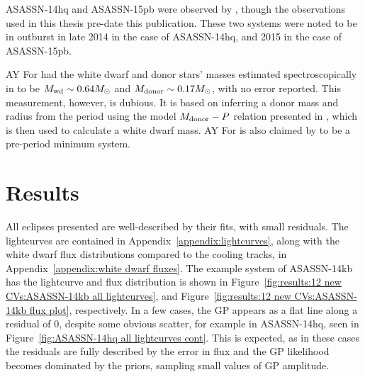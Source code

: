 ASASSN-14hq and ASASSN-15pb were observed by \citet{paterson2019}, though the observations used in this thesis pre-date this publication. These two systems were noted to be in outburst in late 2014 in the case of ASASSN-14hq, and 2015 in the case of ASASSN-15pb.

AY For had the white dwarf and donor stars' masses estimated spectroscopically in \citet{mason2005} to be $M_{\rm wd} \sim 0.64 M_\odot$ and $M_{\rm donor} \sim 0.17 M_\odot$, with no error reported. This measurement, however, is dubious. It is based on inferring a donor mass and radius from the period using the model $M_{\rm donor} - P$ relation presented in \citet{howell2002}, which is then used to calculate a white dwarf mass. AY For is also claimed by \citet{mason2005} to be a pre-period minimum system.


\section{Results}
\label{sect:results:12 new CVs:results}

All eclipses presented are well-described by their fits, with small residuals. The lightcurves are contained in Appendix~\ref{appendix:lightcurves}, along with the white dwarf flux distributions compared to the cooling tracks, in Appendix~\ref{appendix:white dwarf fluxes}. The example system of ASASSN-14kb has the lightcurve and flux distribution is shown in Figure~\ref{fig:results:12 new CVs:ASASSN-14kb all lightcurves}, and Figure~\ref{fig:results:12 new CVs:ASASSN-14kb flux plot}, respectively.
In a few cases, the GP appears as a flat line along a residual of 0, despite some obvious scatter, for example in ASASSN-14hq, seen in Figure~\ref{fig:ASASSN-14hq all lightcurves cont}. This is expected, as in these cases the residuals are fully described by the error in flux and the GP likelihood becomes dominated by the priors, sampling small values of GP amplitude.

